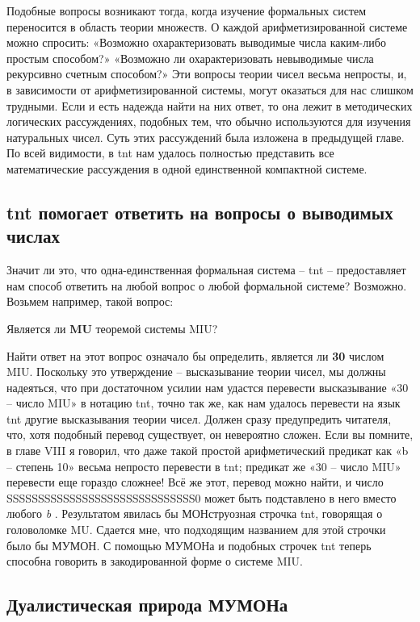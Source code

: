 \documentclass[../main.tex]{subfiles}
\begin{document}
Подобные вопросы возникают тогда, когда изучение формальных систем переносится в область теории множеств. О каждой арифметизированной системе можно спросить: «Возможно охарактеризовать выводимые числа каким-либо простым способом?» «Возможно ли охарактеризовать невыводимые числа рекурсивно счетным способом?» Эти вопросы теории чисел весьма непросты, и, в зависимости от арифметизированной системы, могут оказаться для нас слишком трудными. Если и есть надежда найти на них ответ, то она лежит в методических логических рассуждениях, подобных тем, что обычно используются для изучения натуральных чисел. Суть этих рассуждений была изложена в предыдущей главе. По всей видимости, в \acs{tnt} нам удалось полностью представить все математические рассуждения в одной единственной компактной системе.


\subsection{\acs{tnt} помогает ответить на вопросы о выводимых числах}

Значит ли это, что одна-единственная формальная система \--- \acs{tnt} \--- предоставляет нам способ ответить на любой вопрос о любой формальной системе? Возможно. Возьмем например, такой вопрос:

Является ли \textbf{MU} теоремой системы MIU?

Найти ответ на этот вопрос означало бы определить, является ли \textbf{30} числом MIU\@. Поскольку это утверждение \--- высказывание теории чисел, мы должны надеяться, что при достаточном усилии нам удастся перевести высказывание «30 \--- число MIU» в нотацию \acs{tnt}, точно так же, как нам удалось перевести на язык \acs{tnt} другие высказывания теории чисел. Должен сразу предупредить читателя, что, хотя подобный перевод существует, он невероятно сложен. Если вы помните, в главе VIII я говорил, что даже такой простой арифметический предикат как «b \--- степень 10» весьма непросто перевести в \acs{tnt}; предикат же «30 \--- число MIU» перевести еще гораздо сложнее! Всё же этот, перевод можно найти, и число SSSSSSSSSSSSSSSSSSSSSSSSSSSSSS0 может быть подставлено в него вместо любого \emph{b} . Результатом явилась бы МОНструозная строчка \acs{tnt}, говорящая о головоломке MU\@. Сдается мне, что подходящим названием для этой строчки было бы МУМОН\@. С помощью МУМОНа и подобных строчек \acs{tnt} теперь способна говорить в закодированной форме о системе MIU.


\subsection{Дуалистическая природа МУМОНа}
\end{document}
